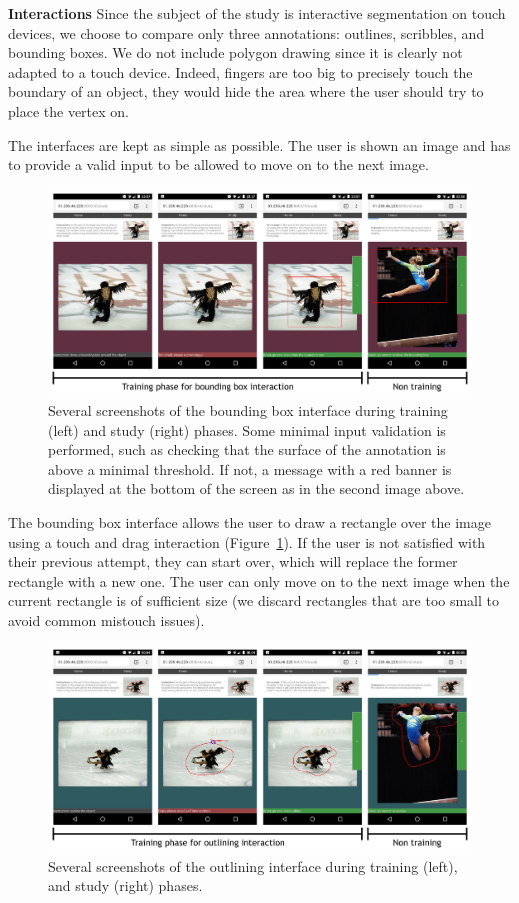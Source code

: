 \textbf{Interactions}
Since the subject of the study is interactive segmentation on touch devices,
we choose to compare only three annotations:
outlines, scribbles, and bounding boxes.
We do not include polygon drawing since
it is clearly not adapted to a touch device.
Indeed, fingers are too big to precisely touch the boundary of an object,
they would hide the area where the user should try to place the vertex on.


The interfaces are kept as simple as possible.
The user is shown an image and has to provide a valid input
to be allowed to move on to the next image.


\begin{figure}[ht]
\includegraphics[width=\columnwidth]{assets/img/app_rect.jpg}
\caption{Several screenshots of the bounding box interface
during training (left) and study (right) phases.
Some minimal input validation is performed, such as checking
that the surface of the annotation is above a minimal threshold.
If not, a message with a red banner is displayed at the bottom
of the screen as in the second image above.}%
\label{fig:rectangle}
\end{figure}


The bounding box interface allows the user to draw a rectangle
over the image using a touch and drag interaction (Figure~\ref{fig:rectangle}).
If the user is not satisfied with their previous attempt,
they can start over, which will replace the former rectangle with a new one.
The user can only move on to the next image when the current rectangle
is of sufficient size (we discard rectangles
that are too small to avoid common mistouch issues).


\begin{figure}[ht]
\includegraphics[width=\columnwidth]{assets/img/app_outline.jpg}
\caption{Several screenshots of the outlining interface
during training (left), and study (right) phases.}%
\label{fig:outline}
\end{figure}


